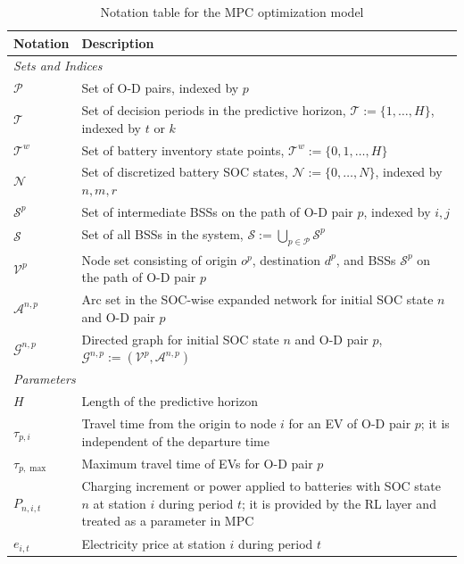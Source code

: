 \documentclass[12pt,hyperref,a4paper,UTF8]{ctexart}
\begin{document}
\begin{table}[!htbp]
  \centering
  \caption{Notation table for the MPC optimization model}
  \label{tab:notation}
  \footnotesize
  \setlength{\tabcolsep}{2pt}
  \renewcommand{\arraystretch}{0.88}
  \begin{tabular}{@{}lp{13cm}@{}}
    \toprule
    \textbf{Notation} & \textbf{Description} \\
    \midrule
    \multicolumn{2}{l}{\textit{Sets and Indices}} \\
    $\mathcal{P}$ & Set of O-D pairs, indexed by $p$ \\
    $\mathcal{T}$ & Set of decision periods in the predictive horizon, $\mathcal{T}:=\{1,\dots,H\}$, indexed by $t$ or $k$ \\
    $\mathcal{T}^{w}$ & Set of battery inventory state points, $\mathcal{T}^{w}:=\{0,1,\dots,H\}$ \\
    $\mathcal{N}$ & Set of discretized battery SOC states, $\mathcal{N}:=\{0,\dots,N\}$, indexed by $n,m,r$ \\
    $\mathcal{S}^{p}$ & Set of intermediate BSSs on the path of O-D pair $p$, indexed by $i,j$ \\
    $\mathcal{S}$ & Set of all BSSs in the system, $\mathcal{S}:=\bigcup_{p\in\mathcal{P}}\mathcal{S}^{p}$ \\
    $\mathcal{V}^{p}$ & Node set consisting of origin $o^{p}$, destination $d^{p}$, and BSSs $\mathcal{S}^{p}$ on the path of O-D pair $p$ \\
    $\mathcal{A}^{n,p}$ & Arc set in the SOC-wise expanded network for initial SOC state $n$ and O-D pair $p$ \\
    $\mathcal{G}^{n,p}$ & Directed graph for initial SOC state $n$ and O-D pair $p$, $\mathcal{G}^{n,p}:=(\mathcal{V}^{p},\mathcal{A}^{n,p})$ \\
    \midrule
    \multicolumn{2}{l}{\textit{Parameters}} \\
    $H$ & Length of the predictive horizon \\
    $\tau_{p,i}$ & Travel time from the origin to node $i$ for an EV of O-D pair $p$; it is independent of the departure time \\
    $\tau_{p,\max}$ & Maximum travel time of EVs for O-D pair $p$ \\
    $P_{n,i,t}$ & Charging increment or power applied to batteries with SOC state $n$ at station $i$ during period $t$; it is provided by the RL layer and treated as a parameter in MPC \\
    $e_{i,t}$ & Electricity price at station $i$ during period $t$ \\

\end{tabular}
\end{table}
\end{document}
